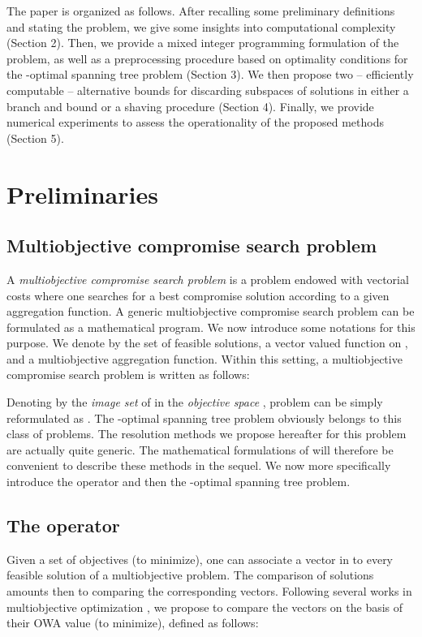 \documentclass[final,3p,times]{elsarticle}
\begin{document}
The paper is organized as follows. After recalling some preliminary
definitions and stating the problem, we give some insights into computational complexity (Section 2). Then, we provide a mixed integer programming formulation of the problem, as well as a preprocessing procedure based on optimality conditions for the -optimal spanning tree problem (Section 3). We then propose two -- efficiently computable -- alternative bounds for discarding subspaces
of solutions in either a branch and bound or a shaving procedure (Section 4). Finally, we provide numerical experiments to assess the operationality of the proposed methods (Section 5). 


\section{Preliminaries}
\label{sec:OWA}


\subsection{Multiobjective compromise search problem}
\label{sec:comp}

A \emph{multiobjective compromise search problem} is a
problem endowed with vectorial costs where one searches for a best
compromise solution according to a given aggregation function. A generic multiobjective compromise search problem can be formulated as a mathematical program.
We now introduce some notations for this purpose. 
We denote by  the set of feasible
solutions,  a vector valued function on , and  a multiobjective aggregation function. Within this setting, a multiobjective compromise search problem is written as follows: 

    

Denoting by  the \emph{image set} of  in the \emph{objective space} , problem  can be simply reformulated as . The -optimal spanning tree problem obviously belongs to this class of
problems. The resolution methods we propose hereafter for this problem are actually quite generic. 
The mathematical formulations of  will therefore be convenient to describe these methods in the sequel.
We now more specifically introduce the  operator and then the -optimal spanning tree problem.

\subsection{The  operator}
\label{sec:def}

Given a set  of objectives (to minimize), one can associate a vector in  to every feasible solution of a multiobjective problem. The comparison of solutions amounts then to comparing the corresponding vectors. Following several works in multiobjective optimization \cite[e.g.][]{Ogryc00,PernS03,PerSS06}, we propose to compare the vectors on the basis of their OWA value \cite{Yager88} (to minimize), defined as follows:
\end{document}
